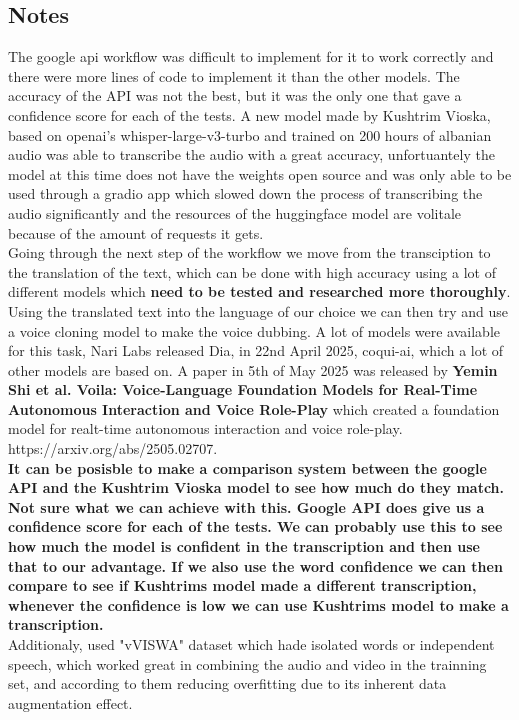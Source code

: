 \documentclass[12pt]{article}
\begin{document}
\subsection{Notes}
The google api workflow was difficult to implement for it to work correctly and there were more lines of code to implement it than the other models. The accuracy of the API was not the best, but it was the only one that gave a confidence score for each of the tests. A new model made by Kushtrim Vioska, based on openai's whisper-large-v3-turbo and trained on 200 hours of albanian audio was able to transcribe the audio with a great accuracy, unfortuantely the model at this time does not have the weights open source and was only able to be used through a gradio app which slowed down the process of transcribing the audio significantly and the resources of the huggingface model are volitale because of the amount of requests it gets.\\
Going through the next step of the workflow we move from the transciption to the translation of the text, which can be done with high accuracy using a lot of different models which \textbf{need to be tested and researched more thoroughly}. \\
Using the translated text into the language of our choice we can then try and use a voice cloning model to make the voice dubbing. A lot of models were available for this task, Nari Labs released Dia, in 22nd April 2025, coqui-ai, which a lot of other models are based on. 
A paper in 5th of May 2025 was released by \textbf{Yemin Shi et al. Voila: Voice-Language Foundation Models for Real-Time Autonomous Interaction and Voice Role-Play} which created a foundation model for realt-time autonomous interaction and voice role-play. https://arxiv.org/abs/2505.02707. \\
\textbf{It can be posisble to make a comparison system between the google API and the Kushtrim Vioska model to see how much do they match. Not sure what we can achieve with this. Google API does give us a confidence score for each of the tests. We can probably use this to see how much the model is confident in the transcription and then use that to our advantage. If we also use the word confidence we can then compare to see if Kushtrims model made a different transcription, whenever the confidence is low we can use Kushtrims model to make a transcription.}\\
Additionaly, \cite{PAWAR2024100084} used "vVISWA" dataset which hade isolated words or independent speech, which worked great in combining the audio and video in the trainning set, and according to them reducing overfitting due to its inherent data augmentation effect.
\end{document}
